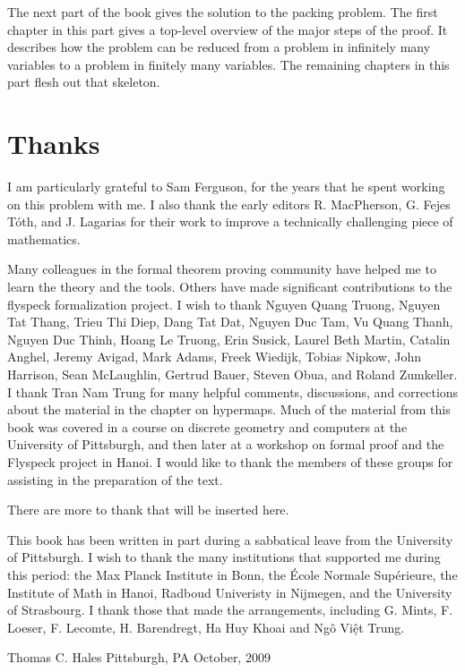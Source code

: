 The next part of the book gives the solution to the packing problem.
The first chapter in this part gives a top-level overview of the major
steps of the proof.  It describes how the problem can be reduced from
a problem in infinitely many variables to a problem in finitely many
variables.  The remaining chapters in this part flesh out that
skeleton.






\section{Thanks}

I am particularly grateful to Sam Ferguson, for the years that
he spent working on this problem with me.  I also thank the early editors
R. MacPherson, G. Fejes T\'oth, and J. Lagarias for their work
to improve a technically challenging piece of mathematics.  

Many colleagues in the formal theorem proving community have helped me
to learn the theory and the tools.  Others have made significant
contributions to the flyspeck formalization project.  I wish to thank
Nguyen Quang Truong, %
Nguyen Tat Thang, %
Trieu Thi Diep, Dang Tat Dat, Nguyen Duc Tam, Vu Quang Thanh, Nguyen
Duc Thinh, Hoang Le Truong, Erin Susick, Laurel Beth Martin, Catalin
Anghel, Jeremy Avigad, Mark Adams, Freek Wiedijk, Tobias Nipkow, John
Harrison, Sean McLaughlin, Gertrud Bauer, Steven Obua, and Roland
Zumkeller.  I thank Tran Nam Trung for many helpful comments,
discussions, and corrections about the material in the chapter on
hypermaps.  Much of the material from this book was covered in a
course on discrete geometry and computers at the University of
Pittsburgh, and then later at a workshop on formal proof and the
Flyspeck project in Hanoi.  I would like to thank the members of these
groups for assisting in the preparation of the text.


\begin{note}%
There are more to thank that will be inserted here.
\end{note}

This book has been written in part during a sabbatical leave from the
University of Pittsburgh.  I wish to thank the many institutions that
supported me during this period: the Max Planck Institute in Bonn, the
\'Ecole Normale Sup\'erieure, the Institute of Math in Hanoi, Radboud
Univeristy in Nijmegen, and the University of Strasbourg.  I thank
those that made the arrangements, including G. Mints, F. Loeser,
F. Lecomte, H. Barendregt, Ha Huy Khoai and Ng\^o Vi\d{\^e}t Trung.


\bigskip
\hbox{}



\bigskip
\hbox{}

{
\parindent=0pt
\obeylines

Thomas C. Hales
Pittsburgh, PA
October, 2009

}







